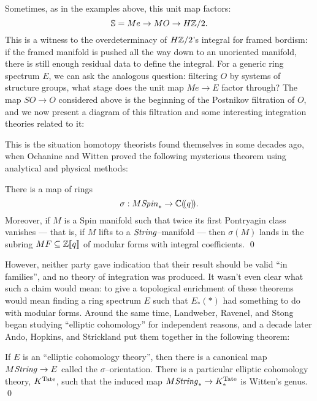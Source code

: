 Sometimes, as in the examples above, this unit map factors: \[\mathbb S = Me \to MO \to H\mathbb Z/2.\]  This is a witness to the overdeterminacy of $H\mathbb Z/2$'s integral for framed bordism: if the framed manifold is pushed all the way down to an unoriented manifold, there is still enough residual data to define the integral.  For a generic ring spectrum $E$, we can ask the analogous question: filtering $O$ by systems of structure groups, what stage does the unit map $Me \to E$ factor through?  The map $SO \to O$ considered above is the beginning of the Postnikov filtration of $O$, and we now present a diagram of this filtration and some interesting integration theories related to it:
\begin{center}
\end{center}

This is the situation homotopy theorists found themselves in some decades ago, when Ochanine and Witten proved the following mysterious theorem using analytical and physical methods:

\begin{theorem}
There is a map of rings \[\sigma: M\mathit{Spin}_* \to \mathbb{C}(\!(q)\!).\]  Moreover, if $M$ is a Spin manifold such that twice its first Pontryagin class vanishes --- that is, if $M$ lifts to a $\mathit{String}$--manifold --- then $\sigma(M)$ lands in the subring $MF \subseteq \mathbb Z\llbracket{q}\rrbracket$ of modular forms with integral coefficients. \qed
\end{theorem}

\noindent However, neither party gave indication that their result should be valid ``in families'', and no theory of integration was produced.  It wasn't even clear what such a claim would mean: to give a topological enrichment of these theorems would mean finding a ring spectrum $E$ such that $E_*(*)$ had something to do with modular forms.  Around the same time, Landweber, Ravenel, and Stong began studying ``elliptic cohomology'' for independent reasons, and a decade later Ando, Hopkins, and Strickland put them together in the following theorem:

\begin{theorem}
If $E$ is an ``elliptic cohomology theory'', then there is a canonical map $M\mathit{String} \to E$ called the $\sigma$--orientation.  There is a particular elliptic cohomology theory, $K^{\mathrm{Tate}}$, such that the induced map $M\mathit{String}_* \to K^{\mathrm{Tate}}_*$ is Witten's genus. \qed
\end{theorem}

